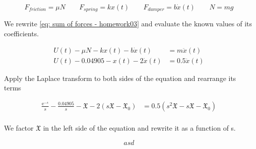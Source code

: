 \begin{equation*}
 F_{friction} = \mu N \qquad F_{spring} = k x(t) \qquad F_{damper} = b \dot{x}(t) \qquad N = mg
\end{equation*}

We rewrite \eqref{eq: sum of forces - homework03} and evaluate the known values of its coefficients.

\begin{equation*}
 \begin{split}
  U(t) - \mu N - k x(t) - b \dot{x}(t) & = m \ddot{x}(t)\\
  U(t) - 0.04905 - x(t) - 2 \dot{x}(t) & = 0.5 \ddot{x}(t)
 \end{split}
\end{equation*}

Apply the Laplace transform to both sides of the equation and rearrange its terms

\begin{equation*}
 \begin{split}
  \frac{\mathrm{e}^{-s}}{s} - \frac{0.04905}{s} - \mathfrak{X} - 2 \left( s \mathfrak{X} - \mathfrak{X_0} \right) 
  & = 0.5 \left( s^2 \mathfrak{X} - s \mathfrak{X} - \mathfrak{X_0} \right)\\
 \end{split}
\end{equation*}

We factor $\mathfrak{X}$ in the left side of the equation and rewrite it as a function of s.

\begin{equation}
 asd
\end{equation}

